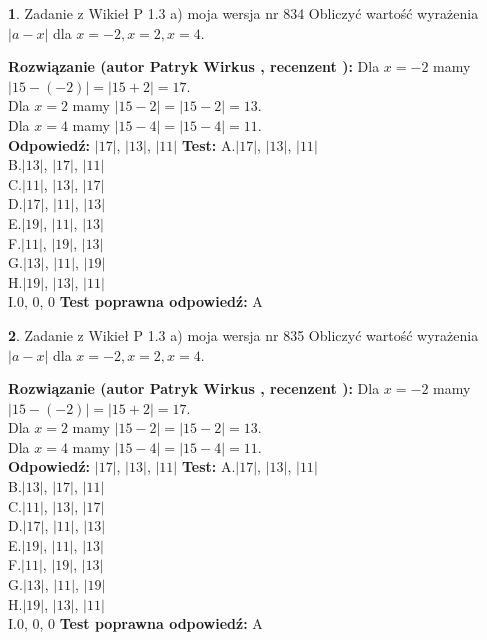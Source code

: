 \documentclass[12pt, a4paper]{article}
\theoremstyle{definition} %
\newtheorem{zad}{}
\newcommand{\zadStart}[1]{\begin{zad}#1\newline}
\newcommand{\zadStop}{\end{zad}}
\newcommand{\rozwStart}[2]{\noindent \textbf{Rozwiązanie (autor #1 , recenzent #2): }\newline}
\newcommand{\rozwStop}{\newline}
\newcommand{\odpStart}{\noindent \textbf{Odpowiedź:}\newline}
\newcommand{\odpStop}{\newline}
\newcommand{\testStart}{\noindent \textbf{Test:}\newline}
\newcommand{\testStop}{\newline}
\newcommand{\kluczStart}{\noindent \textbf{Test poprawna odpowiedź:}\newline}
\newcommand{\kluczStop}{\newline}
\begin{document}
\zadStart{Zadanie z Wikieł P 1.3 a) moja wersja nr 834}
Obliczyć wartość wyrażenia $|a - x|$ dla $x=-2,x=2,x=4$.
\zadStop
\rozwStart{Patryk Wirkus}{}
Dla $x = -2$ mamy $|15 - (-2)| = |15 + 2| = 17$.\\
Dla $x = 2$ mamy $|15 - 2| = |15 - 2| = 13$.\\
Dla $x = 4$ mamy $|15 - 4| = |15 - 4| = 11$.\\
\rozwStop
\odpStart
$|17|$, $|13|$, $|11|$
\odpStop
\testStart
A.$|17|$, $|13|$, $|11|$\\
B.$|13|$, $|17|$, $|11|$\\
C.$|11|$, $|13|$, $|17|$\\
D.$|17|$, $|11|$, $|13|$\\
E.$|19|$, $|11|$, $|13|$\\
F.$|11|$, $|19|$, $|13|$\\
G.$|13|$, $|11|$, $|19|$\\
H.$|19|$, $|13|$, $|11|$\\
I.$0$, $0$, $0$
\testStop
\kluczStart
A
\kluczStop



\zadStart{Zadanie z Wikieł P 1.3 a) moja wersja nr 835}
Obliczyć wartość wyrażenia $|a - x|$ dla $x=-2,x=2,x=4$.
\zadStop
\rozwStart{Patryk Wirkus}{}
Dla $x = -2$ mamy $|15 - (-2)| = |15 + 2| = 17$.\\
Dla $x = 2$ mamy $|15 - 2| = |15 - 2| = 13$.\\
Dla $x = 4$ mamy $|15 - 4| = |15 - 4| = 11$.\\
\rozwStop
\odpStart
$|17|$, $|13|$, $|11|$
\odpStop
\testStart
A.$|17|$, $|13|$, $|11|$\\
B.$|13|$, $|17|$, $|11|$\\
C.$|11|$, $|13|$, $|17|$\\
D.$|17|$, $|11|$, $|13|$\\
E.$|19|$, $|11|$, $|13|$\\
F.$|11|$, $|19|$, $|13|$\\
G.$|13|$, $|11|$, $|19|$\\
H.$|19|$, $|13|$, $|11|$\\
I.$0$, $0$, $0$
\testStop
\kluczStart
A
\kluczStop
\end{document}
